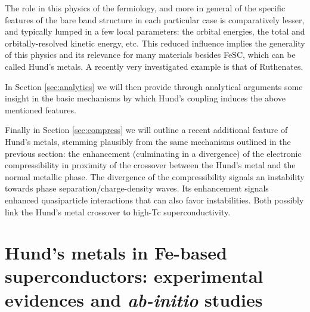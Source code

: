 \documentclass[12pt,twoside]{article}
\begin{document}
The role in this physics of the fermiology, and more in general of the specific features of the bare band structure in each particular case is comparatively lesser, and typically lumped in a few local parameters: the orbital energies, the total and orbitally-resolved kinetic energy, etc.
This reduced influence implies the generality of this physics and its relevance for many materials besides FeSC, which can be called Hund's metals. A recently very investigated example is that of Ruthenates\cite{Mravlje_SrRuO4_coherence,Kondo_OSM_HundsMetal_SrRu2O4_surface}.

In Section \ref{sec:analytics} we will then provide through analytical arguments some insight in the basic mechanisms by which Hund's coupling induces the above mentioned features.
 
Finally in Section \ref{sec:compress} we will outline a recent additional feature of Hund's metals, stemming plausibly from the same mechanisms outlined in the previous section: the enhancement (culminating in a divergence) of the electronic compressibility in proximity of the crossover between the Hund's metal and the normal metallic phase. The divergence of the compressibility signals an instability towards phase separation/charge-density waves. Its enhancement signals enhanced quasiparticle interactions that can also favor instabilities. Both possibly link the Hund's metal crossover to high-Tc superconductivity.



\section{Hund's metals in Fe-based superconductors: experimental evidences and \emph{ab-initio} studies}\label{sec:abinitio-exp}
\end{document}
